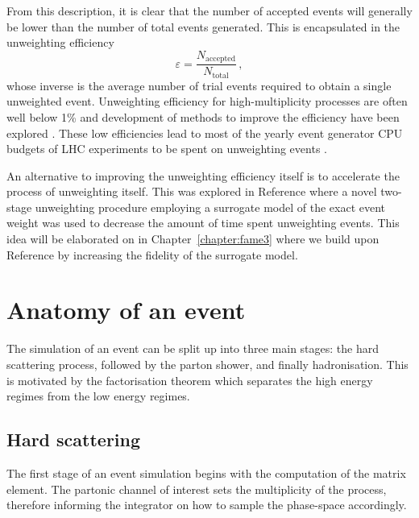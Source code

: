 \documentclass[main.tex]{subfiles}
\begin{document}
    From this description, it is clear that the number
    of accepted events will generally be lower than
    the number of total events generated. This is encapsulated
    in the unweighting efficiency
    \begin{equation}\label{eqn:unweighting_efficiency}
        \varepsilon = \dfrac{N_{\mathrm{accepted}}}{N_{\mathrm{total}}} \, ,
    \end{equation}
    whose inverse is the average number of trial
    events required to obtain a single unweighted event.
    Unweighting efficiency for high-multiplicity processes
    are often well below 1\% \cite{Hoche:2019flt,Gao:2020zvv} and development
    of methods to improve the efficiency have been
    explored \cite{Jadach:1999sf,Jadach:2002kn}.
    These low efficiencies lead to most of the
    yearly event generator CPU budgets of LHC experiments to be spent on
    unweighting events \cite{HSFPhysicsEventGeneratorWG:2020gxw}.

    An alternative to improving the unweighting efficiency
    itself is to accelerate the process of unweighting itself. This
    was explored in Reference \cite{Danziger:2021eeg} where a
    novel two-stage unweighting procedure employing a surrogate
    model of the exact event weight was used to decrease the amount of
    time spent unweighting events. This idea will be elaborated on
    in Chapter~\ref{chapter:fame3} where we build upon
    Reference \cite{Danziger:2021eeg} by increasing the fidelity of
    the surrogate model.

    \section{Anatomy of an event}\label{sec:anatomy_event}
    The simulation of an event can be split up into three
    main stages: the hard scattering process, followed by
    the parton shower, and finally hadronisation.
    This is motivated by the factorisation theorem
    which separates the high energy regimes from the low
    energy regimes.

    \subsection*{Hard scattering}\label{sec:me_generators}
    The first stage of an event simulation begins with
    the computation of the matrix element. The partonic
    channel of interest sets the multiplicity of the process,
    therefore informing the integrator on how to sample the phase-space
    accordingly.
\end{document}
